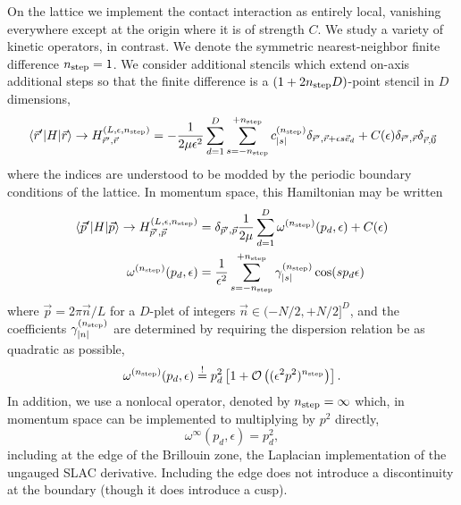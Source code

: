 On the lattice we implement the contact interaction as entirely local, vanishing everywhere except at the origin where it is of strength $C$.  We study a variety of kinetic operators, in contrast.  We denote the symmetric nearest-neighbor finite difference ${n_\text{step}}=1$.  We consider additional stencils which extend on-axis additional steps so that the finite difference is a $(1+2{n_\text{step}} D)$-point stencil in $D$ dimensions,
\begin{equation}
    \left\langle \vec{r}' \middle| H \middle| \vec{r} \right\rangle
    \rightarrow
    H_{\vec{r}',\vec{r}}^{(L,\epsilon,{n_\text{step}})}
    = - \frac{1}{2 \mu \epsilon^2} \sum_{d=1}^{D} \sum_{s=-{n_\text{step}}}^{+{n_\text{step}}} c^{({n_\text{step}})}_{|s|} \delta_{\vec{r}',\vec{r}+\epsilon s \vec{e}_d} + C(\epsilon) \delta_{\vec{r}',\vec{r}}\delta_{\vec{r},\vec{0}}
\end{equation}
where the indices are understood to be modded by the periodic boundary conditions of the lattice.
In momentum space, this Hamiltonian may be written
\begin{align}
    \left\langle \vec{p}' \middle| H \middle| \vec{p} \right\rangle
    \rightarrow
    H_{\vec{p}',\vec{p}}^{(L,\epsilon,{n_\text{step}})}
    &= \delta_{\vec{p}',\vec{p}} \frac{1}{2\mu} \sum_{d=1}^{D} \omega^{({n_\text{step}})}(p_d,\epsilon) + C(\epsilon)
    \\
    \omega^{({n_\text{step}})}(p_d,\epsilon)
    &= \frac{1}{\epsilon^2} \sum_{s=-{n_\text{step}}}^{+{n_\text{step}}} \gamma_{|s|}^{({n_\text{step}})} \cos(s p_d \epsilon)
\end{align}
where $\vec{p} = 2\pi \vec{n}/L$ for a $D$-plet of integers $\vec{n} \in (-N/2, +N/2]^D$, and the coefficients $\gamma_{|n|}^{({n_\text{step}})}$ are determined by requiring the dispersion relation be as quadratic as possible,
\begin{equation}
    \omega^{({n_\text{step}})}(p_d,\epsilon) \overset{!}{=} p_d^2 \left[ 1 + \mathcal{O}\left((\epsilon^2p^2)^{{n_\text{step}}}\right)\right].
\end{equation}
In addition, we use a nonlocal operator, denoted by ${n_\text{step}}=\infty$ which, in momentum space can be implemented to multiplying by $p^2$ directly,
\begin{equation}
    \omega^{\infty}(p_d,\epsilon) = p_d^2,
\end{equation}
including at the edge of the Brillouin zone, the Laplacian implementation of the ungauged SLAC derivative.
Including the edge does not introduce a discontinuity at the boundary (though it does introduce a cusp).

